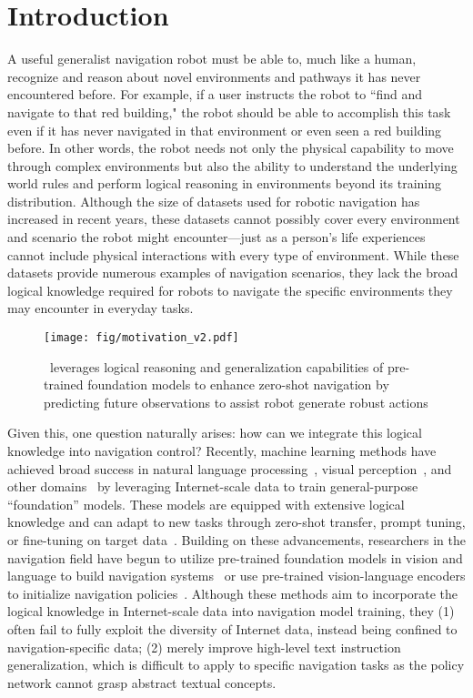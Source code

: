 \section{Introduction}

A useful generalist navigation robot must be able to, much like a human, recognize and reason about novel environments and pathways it has never encountered before. 
%
For example, if a user instructs the robot to ``find and navigate to that red building," the robot should be able to accomplish this task even if it has never navigated in that environment or even seen a red building before. 
%
In other words, the robot needs not only the physical capability to move through complex environments but also the ability to understand the underlying world rules and perform logical reasoning in environments beyond its training distribution.
%
Although the size of datasets used for robotic navigation has increased in recent years, these datasets cannot possibly cover every environment and scenario the robot might encounter—just as a person's life experiences cannot include physical interactions with every type of environment. 
%
While these datasets provide numerous examples of navigation scenarios, they lack the broad logical knowledge required for robots to navigate the specific environments they may encounter in everyday tasks.

\begin{figure}[thpb]
  \centering 
  \texttt{[image: fig/motivation\_v2.pdf]}
  \caption{\mname ~leverages logical reasoning and generalization capabilities of pre-trained foundation models to enhance zero-shot navigation by predicting future observations to assist robot generate robust actions}
  \label{fig:motivation}
\end{figure}

Given this, one question naturally arises: how can we integrate this logical knowledge into navigation control? 
%
Recently, machine learning methods have achieved broad success in natural language processing~\cite{brown2020language}, visual perception~\cite{podell2023sdxl,yu2025gamefactory,qin2024worldsimbench,li2025t2isafety,an2024agfsync}, and other domains~\cite{brohan2022rt,brohan2023rt,huang2024story3d,zhang2024ad} by leveraging Internet-scale data to train general-purpose “foundation” models. 
%
These models are equipped with extensive logical knowledge and can adapt to new tasks through zero-shot transfer, prompt tuning, or fine-tuning on target data~\cite{qin2023mp5,li2024manipllm,zhou2024code}. 
%
Building on these advancements, researchers in the navigation field have begun to utilize pre-trained foundation models in vision and language to build navigation systems~\cite{shah2023vint} or use pre-trained vision-language encoders to initialize navigation policies~\cite{ lin2024navcot, NavGPT}.
%
Although these methods aim to incorporate the logical knowledge in Internet-scale data into navigation model training, they (1) often fail to fully exploit the diversity of Internet data, instead being confined to navigation-specific data; (2) merely improve high-level text instruction generalization, which is difficult to apply to specific navigation tasks as the policy network cannot grasp abstract textual concepts.


